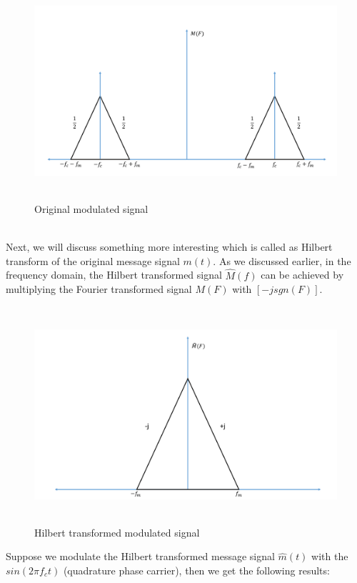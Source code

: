 \begin{figure}[h]
	\centering
	\includegraphics[width=1.0\textwidth, height=8cm]{./sdf/simplified_coherent_receiver/figures/SSB2.pdf}
	\caption{Original modulated signal}\label{Original_modulated_signal}
\end{figure}\\ 
Next, we will discuss something more interesting which is called as Hilbert transform of the original message signal $m(t)$. As we discussed earlier, in the frequency domain, the Hilbert transformed signal $\hat{M}(f)$ can be achieved by multiplying the Fourier transformed signal $M(F)$ with $[-j sgn(F)]$.
\begin{figure}[h]
	\centering
	\includegraphics[width=1.0\textwidth, height=8cm]{./sdf/simplified_coherent_receiver/figures/SSB3.pdf}
	\caption{Hilbert transformed modulated signal}\label{Hilbert_Transformed_signal}
\end{figure}
Suppose we modulate the Hilbert transformed message signal $\hat{m}(t)$  with the $sin(2\pi f_c t)$ (quadrature phase carrier), then we get the following results:

